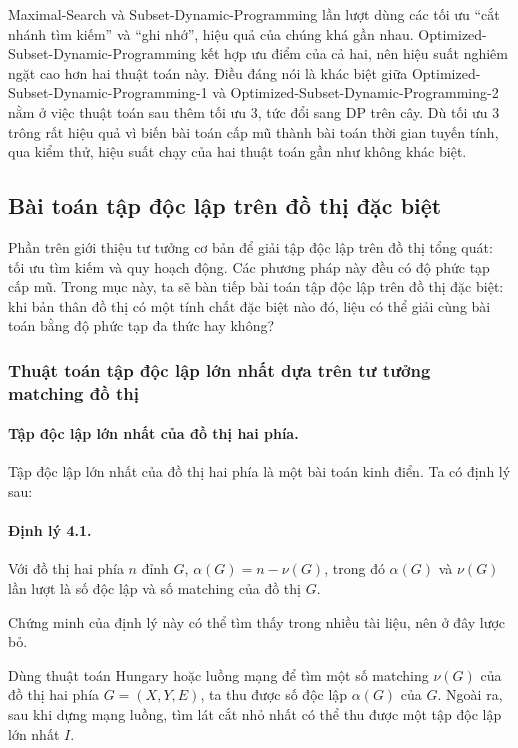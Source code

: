 \documentclass[11pt]{article}
\begin{document}
Maximal-Search và Subset-Dynamic-Programming lần lượt dùng các tối ưu ``cắt
nhánh tìm kiếm'' và ``ghi nhớ'', hiệu quả của chúng khá gần nhau.
Optimized-Subset-Dynamic-Programming kết hợp ưu điểm của cả hai, nên hiệu suất
nghiêm ngặt cao hơn hai thuật toán này. Điều đáng nói là khác biệt giữa
Optimized-Subset-Dynamic-Programming-1 và
Optimized-Subset-Dynamic-Programming-2 nằm ở việc thuật toán sau thêm tối ưu 3,
tức đổi sang DP trên cây. Dù tối ưu 3 trông rất hiệu quả vì biến bài toán cấp
mũ thành bài toán thời gian tuyến tính, qua kiểm thử, hiệu suất chạy của hai
thuật toán gần như không khác biệt.

\subsection{Bài toán tập độc lập trên đồ thị đặc biệt}

Phần trên giới thiệu tư tưởng cơ bản để giải tập độc lập trên đồ thị tổng quát:
tối ưu tìm kiếm và quy hoạch động. Các phương pháp này đều có độ phức tạp cấp
mũ. Trong mục này, ta sẽ bàn tiếp bài toán tập độc lập trên đồ thị đặc biệt:
khi bản thân đồ thị có một tính chất đặc biệt nào đó, liệu có thể giải cùng bài
toán bằng độ phức tạp đa thức hay không?

\subsubsection{Thuật toán tập độc lập lớn nhất dựa trên tư tưởng matching đồ thị}

\paragraph{Tập độc lập lớn nhất của đồ thị hai phía.}
Tập độc lập lớn nhất của đồ thị hai phía là một bài toán kinh điển. Ta có định
lý sau:

\paragraph{Định lý 4.1.}
Với đồ thị hai phía \(n\) đỉnh \(G\), \(\alpha(G)=n-\nu(G)\), trong đó
\(\alpha(G)\) và \(\nu(G)\) lần lượt là số độc lập và số matching của đồ thị
\(G\).

Chứng minh của định lý này có thể tìm thấy trong nhiều tài liệu, nên ở đây
lược bỏ.

Dùng thuật toán Hungary hoặc luồng mạng để tìm một số matching \(\nu(G)\) của
đồ thị hai phía \(G=(X,Y,E)\), ta thu được số độc lập \(\alpha(G)\) của \(G\).
Ngoài ra, sau khi dựng mạng luồng, tìm lát cắt nhỏ nhất có thể thu được một
tập độc lập lớn nhất \(I\).
\end{document}
